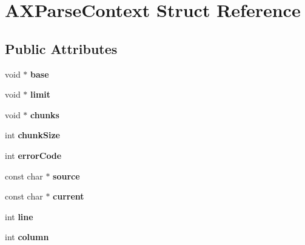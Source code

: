 \hypertarget{structAXParseContext}{\section{A\-X\-Parse\-Context Struct Reference}
\label{structAXParseContext}
}
\subsection*{Public Attributes}
\begin{DoxyCompactItemize}
\item 
\hypertarget{structAXParseContext_a02188f63613619c7fb0bba845ede390d}{void $\ast$ {\bfseries base}}\label{structAXParseContext_a02188f63613619c7fb0bba845ede390d}

\item 
\hypertarget{structAXParseContext_a52bff9b80096bd445612deffd57a0d6b}{void $\ast$ {\bfseries limit}}\label{structAXParseContext_a52bff9b80096bd445612deffd57a0d6b}

\item 
\hypertarget{structAXParseContext_ac832b33688d02483172298d573fe8ab6}{void $\ast$ {\bfseries chunks}}\label{structAXParseContext_ac832b33688d02483172298d573fe8ab6}

\item 
\hypertarget{structAXParseContext_ae4561d3450587617901aef5f1302a77e}{int {\bfseries chunk\-Size}}\label{structAXParseContext_ae4561d3450587617901aef5f1302a77e}

\item 
\hypertarget{structAXParseContext_af10a9168c47cec4040133ca34651cd40}{int {\bfseries error\-Code}}\label{structAXParseContext_af10a9168c47cec4040133ca34651cd40}

\item 
\hypertarget{structAXParseContext_acd995f0076e8a744c40539763069bc3f}{const char $\ast$ {\bfseries source}}\label{structAXParseContext_acd995f0076e8a744c40539763069bc3f}

\item 
\hypertarget{structAXParseContext_ab16ff531a06552602cd4703e9eb92223}{const char $\ast$ {\bfseries current}}\label{structAXParseContext_ab16ff531a06552602cd4703e9eb92223}

\item 
\hypertarget{structAXParseContext_aee75f10a873a8ef669bb21d28ae14a5c}{int {\bfseries line}}\label{structAXParseContext_aee75f10a873a8ef669bb21d28ae14a5c}

\item 
\hypertarget{structAXParseContext_a0f2bfa7c8a1f043e7492a32ec34c1760}{int {\bfseries column}}\label{structAXParseContext_a0f2bfa7c8a1f043e7492a32ec34c1760}


\end{DoxyCompactItemize}
